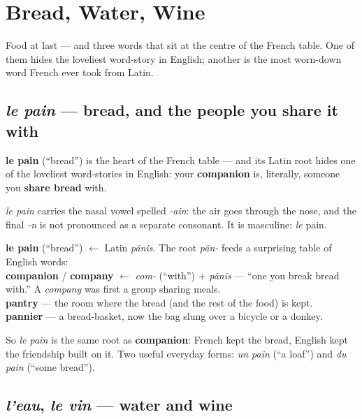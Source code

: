 \chapter{Bread, Water, Wine}
\label{ch:food}

Food at last --- and three words that sit at the centre of the French table.
One of them hides the loveliest word-story in English; another is the most
worn-down word French ever took from Latin.

\section{\emph{le pain} --- bread, and the people you share it with}
\label{lesson:pain}

\textbf{le pain} (``bread'') is the heart of the French table --- and its Latin
root hides one of the loveliest word-stories in English: your
\textbf{companion} is, literally, someone you \textbf{share bread} with.

\begin{sounds}
\emph{le pain} carries the nasal vowel spelled \emph{-ain}: the air goes
through the nose, and the final \emph{-n} is not pronounced as a separate
consonant. It is masculine: \emph{le} pain.
\end{sounds}

\begin{cousinweb}
\textbf{le pain} (``bread'') $\leftarrow$ Latin \emph{p\=anis}. The root
\emph{p\=an-} feeds a surprising table of English words:\\[3pt]
\textbf{companion} / \textbf{company} $\leftarrow$ \emph{com-} (``with'') $+$
\emph{p\=anis} --- ``one you break bread with.'' A \emph{company} was first a
group sharing meals.\\[3pt]
\textbf{pantry} --- the room where the bread (and the rest of the food) is
kept.\\[3pt]
\textbf{pannier} --- a bread-basket, now the bag slung over a bicycle or a
donkey.
\end{cousinweb}

\begin{culture}
So \emph{le pain} is the same root as \textbf{companion}: French kept the
bread, English kept the friendship built on it. Two useful everyday forms:
\emph{un pain} (``a loaf'') and \emph{du pain} (``some bread'').
\end{culture}

\section{\emph{l'eau}, \emph{le vin} --- water and wine}
\label{lesson:eau-vin}

